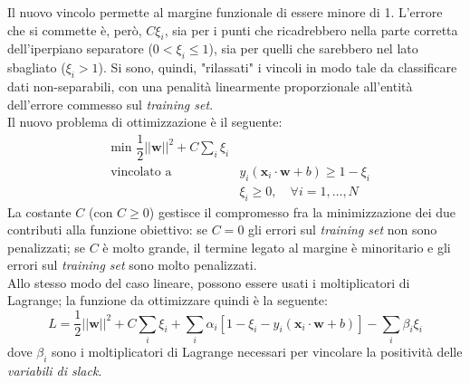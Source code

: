 Il nuovo vincolo permette al margine funzionale di essere minore di 1. L'errore che si commette è, però, $C\xi_i$, sia per i punti che ricadrebbero nella parte corretta dell'iperpiano separatore ($0<\xi_i\leq1$), sia per quelli che sarebbero nel lato sbagliato ($\xi_i>1$).
Si sono, quindi, "rilassati" i vincoli in modo tale da classificare dati non-separabili, con una penalità linearmente proporzionale all'entità dell'errore commesso sul \emph{training set}.\\

Il nuovo problema di ottimizzazione è il seguente:
\begin{eqnarray}
\label{eq:ottimizzazione_softmargin}
&\text{min }\dfrac{1}{2}\vert\vert\mathbf{w}\vert\vert^2+C\sum_i\xi_i\\
&\text{vincolato a }&y_i\left (\mathbf{x}_i\cdot\mathbf{w}+b \right )\geq1-\xi_i\\
&& \xi_i\geq0, \quad \forall i=1,\ldots,N
\end{eqnarray}
La costante $C$ (con $C\geq0$) gestisce il compromesso fra la minimizzazione dei due contributi alla funzione obiettivo: se $C=0$ gli errori sul \emph{training set} non sono penalizzati; se $C$ è molto grande, il termine legato al margine è minoritario e gli errori sul \emph{training set} sono molto penalizzati.
\\
Allo stesso modo del caso lineare, possono essere usati i moltiplicatori di Lagrange; la funzione da ottimizzare quindi è la seguente:
\begin{equation}
\label{eq:lagrangiana_sofmargin}
L=\dfrac{1}{2}\vert\vert\mathbf{w}\vert\vert^2+C\sum_i\xi_i+\sum_i\alpha_i\left [1-\xi_i-y_i\left (\mathbf{x}_i\cdot\mathbf{w}+b \right )\right ]-\sum_i\beta_i\xi_i
\end{equation}
dove $\beta_i$ sono i moltiplicatori di Lagrange necessari per vincolare la positività delle \emph{variabili di slack}.	
\\

